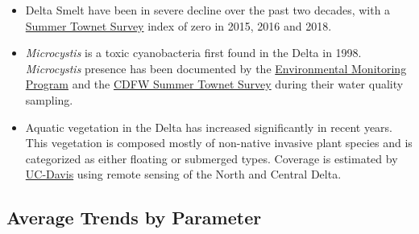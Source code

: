 \documentclass[
]{book}
\providecommand{\tightlist}{%
  \setlength{\itemsep}{0pt}\setlength{\parskip}{0pt}}
\begin{document}
\begin{itemize}
\tightlist
\item
  Delta Smelt have been in severe decline over the past two decades, with a \href{https://wildlife.ca.gov/Conservation/Delta/Townet-Survey}{Summer Townet Survey} index of zero in 2015, 2016 and 2018.
\item
  \emph{Microcystis} is a toxic cyanobacteria first found in the Delta in 1998. \emph{Microcystis} presence has been documented by the \href{https://emp.baydeltalive.com/wiki/12297}{Environmental Monitoring Program} and the \href{https://wildlife.ca.gov/Conservation/Delta/Townet-Survey}{CDFW Summer Townet Survey} during their water quality sampling.
\item
  Aquatic vegetation in the Delta has increased significantly in recent years. This vegetation is composed mostly of non-native invasive plant species and is categorized as either floating or submerged types. Coverage is estimated by \href{http://cstars.metro.ucdavis.edu/}{UC-Davis} using remote sensing of the North and Central Delta.
\end{itemize}

\hypertarget{average-trends-by-parameter}{%
\subsection{Average Trends by Parameter}\label{average-trends-by-parameter}}
\end{document}
